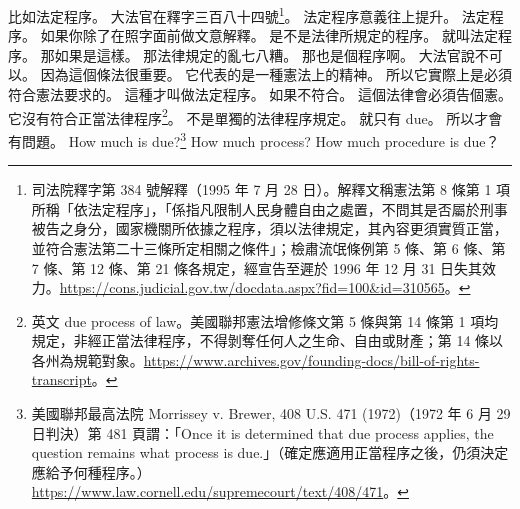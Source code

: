 \hypertarget{c01:cue:2566}{}比如法定程序。
\hypertarget{c01:cue:2567}{}大法官在釋字三百八十四號\footnote{司法院釋字第 384 號解釋（1995 年 7 月 28 日）。解釋文稱憲法第 8 條第 1 項所稱「依法定程序」，「係指凡限制人民身體自由之處置，不問其是否屬於刑事被告之身分，國家機關所依據之程序，須以法律規定，其內容更須實質正當，並符合憲法第二十三條所定相關之條件」；檢肅流氓條例第 5 條、第 6 條、第 7 條、第 12 條、第 21 條各規定，經宣告至遲於 1996 年 12 月 31 日失其效力。\url{https://cons.judicial.gov.tw/docdata.aspx?fid=100&id=310565}。}。
\hypertarget{c01:cue:2568}{}法定程序意義往上提升。
\hypertarget{c01:cue:2569}{}法定程序。
\hypertarget{c01:cue:2570}{}如果你除了在照字面前做文意解釋。
\hypertarget{c01:cue:2571}{}是不是法律所規定的程序。
\hypertarget{c01:cue:2572}{}就叫法定程序。
\hypertarget{c01:cue:2573}{}那如果是這樣。
\hypertarget{c01:cue:2574}{}那法律規定的亂七八糟。
\hypertarget{c01:cue:2575}{}那也是個程序啊。
\hypertarget{c01:cue:2576}{}大法官說不可以。
\hypertarget{c01:cue:2577}{}因為這個條法很重要。
\hypertarget{c01:cue:2578}{}它代表的是一種憲法上的精神。
\hypertarget{c01:cue:2579}{}所以它實際上是必須符合憲法要求的。
\hypertarget{c01:cue:2580}{}這種才叫做法定程序。
\hypertarget{c01:cue:2581}{}如果不符合。
\hypertarget{c01:cue:2582}{}這個法律會必須告個憲。
\hypertarget{c01:cue:2583}{}它沒有符合正當法律程序\footnote{英文 due process of law。美國聯邦憲法增修條文第 5 條與第 14 條第 1 項均規定，非經正當法律程序，不得剝奪任何人之生命、自由或財產；第 14 條以各州為規範對象。\url{https://www.archives.gov/founding-docs/bill-of-rights-transcript}。}。
\hypertarget{c01:cue:2584}{}不是單獨的法律程序規定。
\hypertarget{c01:cue:2585}{}就只有 due。
\hypertarget{c01:cue:2586}{}所以才會有問題。
\hypertarget{c01:cue:2587}{}How much is due?\footnote{美國聯邦最高法院 Morrissey v. Brewer, 408 U.S. 471 (1972)（1972 年 6 月 29 日判決）第 481 頁謂：「Once it is determined that due process applies, the question remains what process is due.」（確定應適用正當程序之後，仍須決定應給予何種程序。）\url{https://www.law.cornell.edu/supremecourt/text/408/471}。}
\hypertarget{c01:cue:2588}{}How much process?
\hypertarget{c01:cue:2589}{}How much procedure is due？


